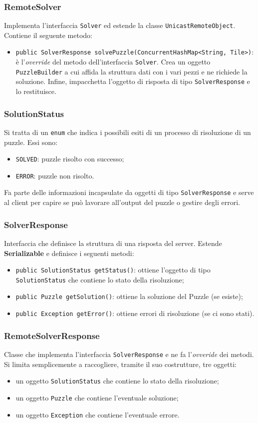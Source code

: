 \documentclass[a4paper, 12pt]{article}
\newcommand{\strong}[1]{ \textbf{#1}}
\begin{document}
\subsubsection{RemoteSolver}
Implementa l'interfaccia \verb|Solver| ed estende la classe
\verb|UnicastRemoteObject|. Contiene il seguente metodo:
\begin{itemize}
\item \verb|public SolverResponse solvePuzzle(ConcurrentHashMap<String, Tile>)|:
\\ è l'\emph{override} del metodo dell'interfaccia \verb|Solver|. Crea un
oggetto \verb|PuzzleBuilder| a cui affida la struttura dati con i vari pezzi e
ne richiede la soluzione. Infine, impacchetta l'oggetto di risposta di tipo
\verb|SolverResponse| e lo restituisce.
\end{itemize}
\subsubsection{SolutionStatus}
Si tratta di un \verb|enum| che indica i possibili esiti di un processo di
risoluzione di un puzzle. Essi sono:
\begin{itemize}
\item \verb|SOLVED|: puzzle risolto con successo;
\item \verb|ERROR|: puzzle non risolto.
\end{itemize}
Fa parte delle informazioni incapsulate da oggetti di tipo \verb|SolverResponse|
e serve al client per capire se può lavorare all'output del puzzle o gestire
degli errori.
\subsubsection{SolverResponse}
Interfaccia che definisce la struttura di una risposta del server. Estende
\strong{Serializable} e definisce i seguenti metodi:
\begin{itemize}
\item \verb|public SolutionStatus getStatus()|: ottiene l'oggetto di tipo
\verb|SolutionStatus| che contiene lo stato della risoluzione;
\item \verb|public Puzzle getSolution()|: ottiene la soluzione del Puzzle (se
esiste);
\item \verb|public Exception getError()|: ottiene errori di risoluzione (se ci
sono stati).
\end{itemize}
\subsubsection{RemoteSolverResponse}
Classe che implementa l'interfaccia \verb|SolverResponse| e ne fa
l'\emph{ovveride} dei metodi. Si limita semplicemente a raccogliere, tramite il
suo costrutture, tre oggetti:
\begin{itemize}
\item un oggetto \verb|SolutionStatus| che contiene lo stato della risoluzione;
\item un oggetto \verb|Puzzle| che contiene l'eventuale soluzione;
\item un oggetto \verb|Exception| che contiene l'eventuale errore.
\end{itemize}
\end{document}
